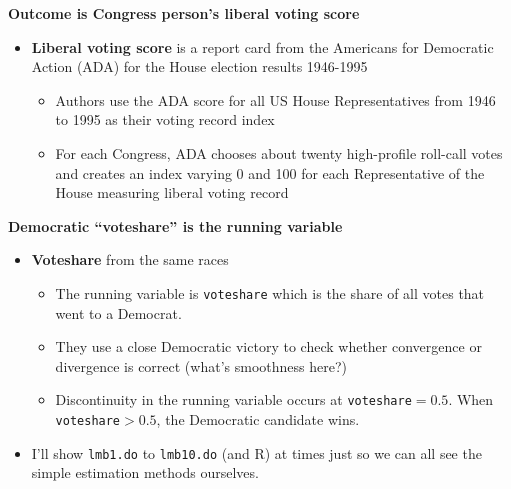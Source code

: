 \documentclass[notes=show]{beamer}
\begin{document}
\begin{frame}[plain]
	\begin{center}
	\textbf{Outcome is Congress person's liberal voting score}
	\end{center}
	
	\begin{itemize}
	\item \textbf{Liberal voting score} is a report card from the Americans for Democratic Action (ADA) for the House election results 1946-1995
		\begin{itemize}
		\item Authors use the ADA score for all US House Representatives from 1946 to 1995 as their voting record index
		\item For each Congress, ADA chooses about twenty high-profile roll-call votes and creates an index varying 0 and 100 for each Representative of the House measuring liberal voting record
		\end{itemize}
	\end{itemize}
\end{frame}

\begin{frame}[plain]
\begin{center}
\textbf{Democratic ``voteshare'' is the running variable}
\end{center}

\begin{itemize}
	\item \textbf{Voteshare} from the same races
		\begin{itemize}
		\item The running variable is \texttt{voteshare} which is the share of all votes that went to a Democrat. 
		\item They use a close Democratic victory to check whether convergence or divergence is correct (what's smoothness here?)
		\item  Discontinuity in the running variable occurs at \texttt{voteshare}$=0.5$. When \texttt{voteshare}$>0.5$, the Democratic candidate wins.  
		\end{itemize}
	\item I'll show \texttt{lmb1.do} to \texttt{lmb10.do} (and R) at times just so we can all see the simple estimation methods ourselves. 
\end{itemize}

\end{frame}
\end{document}
